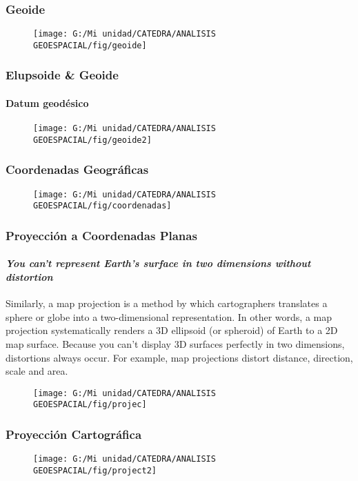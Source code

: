 \documentclass[14pt]{beamer}
\begin{document}
\begin{frame}
\frametitle{Geoide}
  \begin{figure}
    \centering
    \texttt{[image: G:/Mi unidad/CATEDRA/ANALISIS GEOESPACIAL/fig/geoide]}
  \end{figure}
\end{frame}
\begin{frame}
\frametitle{Elupsoide \& Geoide}
\framesubtitle{Datum geodésico}
  \begin{figure}
    \centering
    \texttt{[image: G:/Mi unidad/CATEDRA/ANALISIS GEOESPACIAL/fig/geoide2]}
  \end{figure}
\end{frame}
\begin{frame}
\frametitle{Coordenadas Geográficas}
  \begin{figure}
    \centering
    \texttt{[image: G:/Mi unidad/CATEDRA/ANALISIS GEOESPACIAL/fig/coordenadas]}
  \end{figure}
\end{frame}
\begin{frame}
\frametitle{Proyección a Coordenadas Planas}
\framesubtitle{\emph{You can’t represent Earth’s surface in two dimensions without distortion}}
\scriptsize{Similarly, a map projection is a method by which cartographers translates a sphere or globe into a two-dimensional representation. In other words, a map projection systematically renders a 3D ellipsoid (or spheroid) of Earth to a 2D map surface. Because you can’t display 3D surfaces perfectly in two dimensions, distortions always occur. For example, map projections distort distance, direction, scale and area.}
  \begin{figure}
    \centering
    \texttt{[image: G:/Mi unidad/CATEDRA/ANALISIS GEOESPACIAL/fig/projec]}
  \end{figure}
\end{frame}
\begin{frame}
\frametitle{Proyección Cartográfica}
  \begin{figure}
    \centering
    \texttt{[image: G:/Mi unidad/CATEDRA/ANALISIS GEOESPACIAL/fig/project2]}
  \end{figure}
\end{frame}
\end{document}
